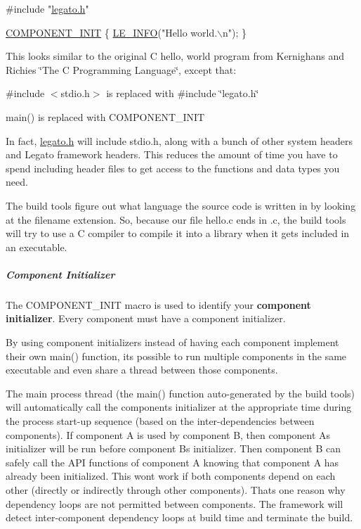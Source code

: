 \begin{DoxyCode}
\textcolor{preprocessor}{#include "\hyperlink{legato_8h}{legato.h}"}

\hyperlink{le__event_loop_8h_abdb9187a56836a93d19cc793cbd4b7ec}{COMPONENT\_INIT}
\{
    \hyperlink{le__log_8h_a23e6d206faa64f612045d688cdde5808}{LE\_INFO}(\textcolor{stringliteral}{"Hello world.\(\backslash\)n"});
\}
\end{DoxyCode}


This looks similar to the original C {\ttfamily hello}, world program from Kernighan\textquotesingle{}s and Richie\textquotesingle{}s \char`\"{}\+The C Programming Language\char`\"{}, except that\+:
\begin{DoxyItemize}
\item \#include $<$stdio.\+h$>$ is replaced with \#include \char`\"{}legato.\+h\char`\"{}
\item main() is replaced with C\+O\+M\+P\+O\+N\+E\+N\+T\+\_\+\+I\+N\+I\+T
\end{DoxyItemize}

In fact, \hyperlink{legato_8h}{legato.\+h} will include stdio.\+h, along with a bunch of other system headers and Legato framework headers. This reduces the amount of time you have to spend including header files to get access to the functions and data types you need.

The build tools figure out what language the source code is written in by looking at the filename extension. So, because our file {\ttfamily hello.\+c} ends in {\ttfamily }.c, the build tools will try to use a C compiler to compile it into a library when it gets included in an executable.\hypertarget{basic_apps_create_basicAppsCreate_componentInit}{}\subparagraph{Component Initializer}\label{basic_apps_create_basicAppsCreate_componentInit}
The {\ttfamily C\+O\+M\+P\+O\+N\+E\+N\+T\+\_\+\+I\+N\+I\+T} macro is used to identify your {\bfseries  component initializer}. Every component must have a component initializer.

By using component initializers instead of having each component implement their own main() function, it\textquotesingle{}s possible to run multiple components in the same executable and even share a thread between those components.

The main process thread (the main() function auto-\/generated by the build tools) will automatically call the component\textquotesingle{}s initializer at the appropriate time during the process start-\/up sequence (based on the inter-\/dependencies between components). If component A is used by component B, then component A\textquotesingle{}s initializer will be run before component B\textquotesingle{}s initializer. Then component B can safely call the A\+P\+I functions of component A knowing that component A has already been initialized. This won\textquotesingle{}t work if both components depend on each other (directly or indirectly through other components). That\textquotesingle{}s one reason why dependency loops are not permitted between components. The framework will detect inter-\/component dependency loops at build time and terminate the build.

